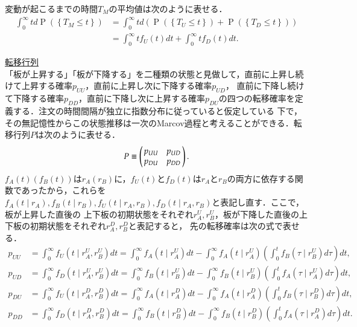 \documentclass[a4j,papersize,disablejfam,slide,14pt]{jsarticle}
\def\prob#1{\operatorname{P} \left(\left\{ #1 \right\}\right)} %
\begin{document}
    変動が起こるまでの時間$T_M$の平均値は次のように表せる．
    \begin{align}
    	\int_{0}^{\infty} t d\prob{T_M \leq t} &= \int_{0}^{\infty} t d(\prob{T_U \leq t} + \prob{T_D \leq t}) \\
        &= \int_{0}^{\infty} t f_U(t) dt + \int_{0}^{\infty} t f_D(t) dt.
    \end{align}
    
\underline{\large 転移行列}\\
    「板が上昇する」「板が下降する」を二種類の状態と見做して，直前に上昇し続けて上昇する確率$p_{UU}$，直前に上昇し次に下降する確率$p_{UD}$，
    直前に下降し続けて下降する確率$p_{DD}$，直前に下降し次に上昇する確率$p_{DU}$の四つの転移確率を定義する．注文の時間間隔が独立に指数分布に従っていると仮定している
    下で，その無記憶性からこの状態推移は一次の{\rm Marcov}過程と考えることができる．転移行列$P$は次のように表せる．
    \begin{align}
    	P \equiv \left(
    	\begin{array}{@{\,}cc@{\,}}
    		p_{UU} & p_{UD} \\
            p_{DU} & p_{DD}
    	\end{array}
    	\right). \\ \label{eq:transient_probability_matrix}
    \end{align}
    $f_A(t)(f_B(t))$は$r_A(r_B)$に，$f_U(t)$と$f_D(t)$は$r_A$と$r_B$の両方に依存する関数であったから，これらを
    $f_A(t \mid r_A), f_B(t \mid r_B), f_U(t \mid r_A, r_B), f_D(t \mid r_A, r_B)$と表記し直す．ここで，板が上昇した直後の
    上下板の初期状態をそれぞれ$r_A^U, r_B^U$，板が下降した直後の上下板の初期状態をそれぞれ$r_A^D, r_B^D$と表記すると，
    先の転移確率は次の式で表せる．
    \begin{align}
    	p_{UU} &= \int_{0}^{\infty} f_U(t \mid r_A^U, r_B^U) dt = \int_{0}^{\infty} f_A(t \mid r_A^U)dt - \int_{0}^{\infty} f_A(t \mid r_A^U) \left( \int_{0}^{t} f_B(\tau \mid r_B^U)d\tau \right) dt, \\
        p_{UD} &= \int_{0}^{\infty} f_D(t \mid r_A^U, r_B^U) dt = \int_{0}^{\infty} f_B(t \mid r_B^U)dt - \int_{0}^{\infty} f_B(t \mid r_B^U) \left( \int_{0}^{t} f_A(\tau \mid r_A^U)d\tau \right) dt, \\
        p_{DU} &= \int_{0}^{\infty} f_U(t \mid r_A^D, r_B^D) dt = \int_{0}^{\infty} f_A(t \mid r_A^D)dt - \int_{0}^{\infty} f_A(t \mid r_A^D) \left( \int_{0}^{t} f_B(\tau \mid r_B^D)d\tau \right) dt, \\
        p_{DD} &= \int_{0}^{\infty} f_D(t \mid r_A^D, r_B^D) dt = \int_{0}^{\infty} f_B(t \mid r_B^D)dt - \int_{0}^{\infty} f_B(t \mid r_B^D) \left( \int_{0}^{t} f_A(\tau \mid r_A^D)d\tau \right) dt.
    \end{align}
\end{document}
